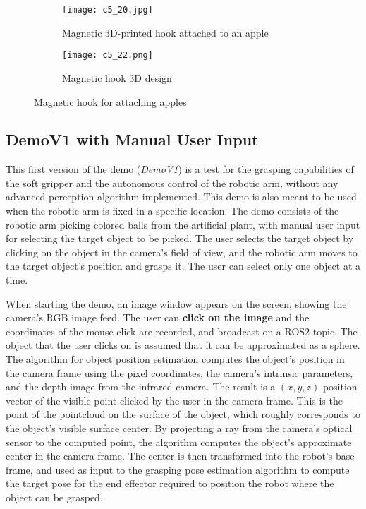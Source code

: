 \begin{figure}[t]
    \centering
    \begin{subfigure}{0.45\textwidth}
        \texttt{[image: c5\_20.jpg]}
        \caption{Magnetic 3D-printed hook attached to an apple}
        \label{fig:hook3dprint}
    \end{subfigure}
    \hfill %
    \begin{subfigure}{0.5\textwidth}
        \texttt{[image: c5\_22.png]}
        \caption{Magnetic hook 3D design}
        \label{fig:hookdesign}
    \end{subfigure}
    \caption{Magnetic hook for attaching apples}
    \label{fig:hook}
\end{figure}

\subsection{DemoV1 with Manual User Input}

This first version of the demo (\textit{DemoV1}) is a test for the grasping capabilities of the soft gripper and
the autonomous control of the robotic arm, without any advanced perception algorithm implemented. 
This demo is also meant to be used when the robotic arm is fixed in a specific location. The demo consists of
the robotic arm picking colored balls from the artificial plant, with manual user input for selecting the target
object to be picked. The user selects the target object by clicking on the object in the camera's field of view,
and the robotic arm moves to the target object's position and grasps it. The user can select only one object at 
a time.

When starting the demo, an image window appears on the screen, showing the camera's RGB image feed.
The user can \textbf{click on the image} and the coordinates of the mouse click are recorded, and broadcast on a ROS2
topic. The object that the user clicks on is assumed that it can be approximated as a sphere.
The algorithm for object position estimation computes the object's position in the camera frame
using the pixel coordinates, the camera's intrinsic parameters, and the depth image from the infrared camera.
The result is a $(x, y, z)$ position vector of the visible point clicked by the user in the camera frame. 
This is the point of the pointcloud on the surface of the object, which roughly corresponds to the 
object's visible surface center. By projecting a ray from the camera's optical sensor to the computed point,
the algorithm computes the object's approximate center in the camera frame. The center is then transformed
into the robot's base frame, and used as input to the grasping pose estimation algorithm to compute the target pose
for the end effector required to position the robot where the object can be grasped.

